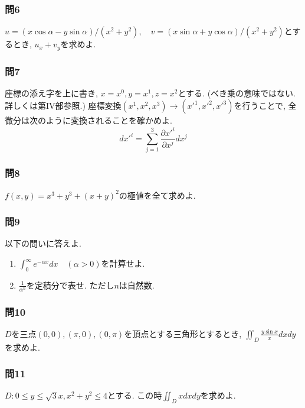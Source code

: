         \subsubsection*{問6} $u=(x\cos\alpha-y\sin\alpha)/(x^2+y^2),\quad v=(x\sin\alpha+y\cos\alpha)/(x^2+y^2)$とするとき, $u_x+v_y$を求めよ.

        \subsubsection*{問7} 座標の添え字を上に書き, $x=x^0,y=x^1,z=x^2$とする. (べき乗の意味ではない. 詳しくは第IV部参照.) 座標変換$(x^1,x^2,x^3)\to (x'^1,x'^2,x'^3)$を行うことで, 全微分は次のように変換されることを確かめよ.
            \begin{equation*}
                dx'^i = \sum_{j=1}^{3}\frac{\partial x'^i}{\partial x^j}dx^j
            \end{equation*}
        
        \subsubsection*{問8} $f(x,y)=x^3+y^3+(x+y)^2$の極値を全て求めよ.

        \subsubsection*{問9} 以下の問いに答えよ.
            \begin{enumerate}\renewcommand{\labelenumi}{(\roman{enumi})}
                \item $\displaystyle \int_{0}^{\infty}e^{-\alpha x}dx \quad (\alpha>0)$を計算せよ.
                \item $\frac{1}{\alpha^n}$を定積分で表せ. ただし$n$は自然数.
            \end{enumerate}
        
        \subsubsection*{問10} $D$を三点$(0,0),(\pi,0),(0,\pi)$を頂点とする三角形とするとき, $\displaystyle \iint_D \frac{y\sin x}{x}dxdy$を求めよ.
        
        \subsubsection*{問11} $D:0\leq y\leq \sqrt{3}x,x^2+y^2\leq 4$とする. この時$\displaystyle \iint_D xdxdy$を求めよ.

